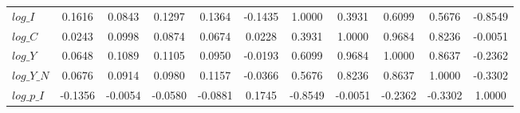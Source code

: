\begin{center}
\begin{longtable}{lcccccccccc}
$log\_I          $	 & 	            0.1616	 & 	            0.0843	 & 	            0.1297	 & 	            0.1364	 & 	           -0.1435	 & 	            1.0000	 & 	            0.3931	 & 	            0.6099	 & 	            0.5676	 & 	           -0.8549 \\ 
$log\_C          $	 & 	            0.0243	 & 	            0.0998	 & 	            0.0874	 & 	            0.0674	 & 	            0.0228	 & 	            0.3931	 & 	            1.0000	 & 	            0.9684	 & 	            0.8236	 & 	           -0.0051 \\ 
$log\_Y          $	 & 	            0.0648	 & 	            0.1089	 & 	            0.1105	 & 	            0.0950	 & 	           -0.0193	 & 	            0.6099	 & 	            0.9684	 & 	            1.0000	 & 	            0.8637	 & 	           -0.2362 \\ 
$log\_Y\_N       $	 & 	            0.0676	 & 	            0.0914	 & 	            0.0980	 & 	            0.1157	 & 	           -0.0366	 & 	            0.5676	 & 	            0.8236	 & 	            0.8637	 & 	            1.0000	 & 	           -0.3302 \\ 
$log\_p\_I       $	 & 	           -0.1356	 & 	           -0.0054	 & 	           -0.0580	 & 	           -0.0881	 & 	            0.1745	 & 	           -0.8549	 & 	           -0.0051	 & 	           -0.2362	 & 	           -0.3302	 & 	            1.0000 \\ 
\end{longtable}
 \end{center}

